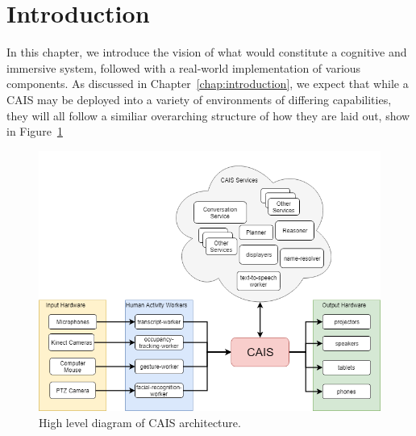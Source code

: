 \section{Introduction}

In this chapter, we introduce the vision of what would constitute a cognitive
and immersive system, followed with a real-world implementation of various
components. As discussed in Chapter~\ref{chap:introduction}, we expect that
while a CAIS may be deployed into a variety of environments of differing
capabilities, they will all follow a similiar overarching structure of how
they are laid out, show in Figure~\ref{fig:cais_high_level}

\begin{figure}
    \centering
    \includegraphics[width=0.5\columnwidth]{chapters/02_technology/figures/cais_high_level.png}
    \caption{High level diagram of CAIS architecture.}
    \label{fig:cais_high_level}
\end{figure}
